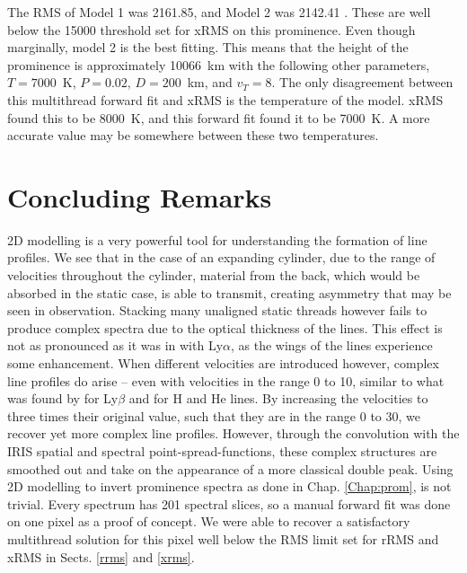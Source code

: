 The RMS of Model 1 was 2161.85, and Model 2 was 2142.41 . These are well below the 15000 threshold set for xRMS on this prominence. Even though marginally, model 2 is the best fitting. This means that the height of the prominence is approximately 10066~km with the following other parameters, $T=7000$~K, $P=0.02$\dyncm, $D=200$~km, and $v_T=8$\kms. The only disagreement between this multithread forward fit and xRMS is the temperature of the model. xRMS found this to be 8000~K, and this forward fit found it to be 7000~K. A more accurate value may be somewhere between these two temperatures.

\section{Concluding Remarks}
2D modelling is a very powerful tool for understanding the formation of line profiles. We see that in the case of an expanding cylinder, due to the range of velocities throughout the cylinder, material from the back, which would be absorbed in the static case, is able to transmit, creating asymmetry that may be seen in observation. Stacking many unaligned static threads however fails to produce complex spectra due to the optical thickness of the lines. This effect is not as pronounced as it was in \cite{labrosse_radiative_2016} with Ly$\alpha$, as the wings of the \mgiihk{} lines experience some enhancement. When different velocities are introduced however, complex line profiles do arise -- even with velocities in the range 0 to 10\kms, similar to what was found by \cite{gunar_lyman-line_2008} for Ly$\beta$ and \cite{labrosse_radiative_2016} for H and He lines. By increasing the velocities to three times their original value, such that they are in the range 0 to 30\kms{}, we recover yet more complex line profiles. However, through the convolution with the IRIS spatial and spectral point-spread-functions, these complex structures are smoothed out and take on the appearance of a more classical \mgiihk{} double peak. Using 2D modelling to invert prominence spectra as done in Chap. \ref{Chap:prom}, is not trivial. Every spectrum has 201 spectral slices, so a manual forward fit was done on one pixel as a proof of concept. We were able to recover a satisfactory multithread solution for this pixel well below the RMS limit set for rRMS and xRMS in Sects. \ref{rrms} and \ref{xrms}.
